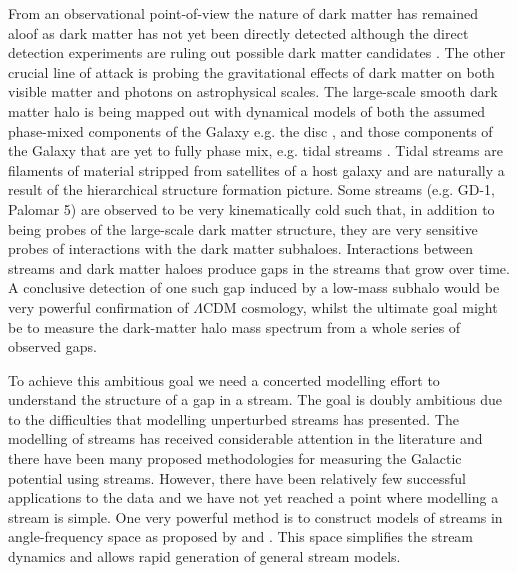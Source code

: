\documentclass[useAMS,usenatbib,fleqn,a4paper]{mn2e}
\begin{document}
From an observational point-of-view the nature of dark matter has remained aloof as dark matter has not yet been directly detected although the direct detection experiments are ruling out possible dark matter candidates \citep{Bertone2005,Feng2010}. The other crucial line of attack is probing the gravitational effects of dark matter on both visible matter and photons on astrophysical scales. The large-scale smooth dark matter halo is being mapped out with dynamical models of both the assumed phase-mixed components of the Galaxy e.g. the disc \citep[e.g.][]{BovyRix2013, Piffl2014}, and those components of the Galaxy that are yet to fully phase mix, e.g. tidal streams \citep[e.g.][]{Koposov2010,Gibbons2014,Kuepper2015,Bowden2015}. Tidal streams are filaments of material stripped from satellites of a host galaxy and are naturally a result of the hierarchical structure formation picture. Some streams (e.g. GD-1, Palomar 5) are observed to be very kinematically cold such that, in addition to being probes of the large-scale dark matter structure, they are very sensitive probes of interactions with the dark matter subhaloes. Interactions between streams and dark matter haloes produce gaps in the streams that grow over time. A conclusive detection of one such gap induced by a low-mass subhalo would be very powerful confirmation of $\Lambda$CDM cosmology, whilst the ultimate goal might be to measure the dark-matter halo mass spectrum from a whole series of observed gaps.

To achieve this ambitious goal we need a concerted modelling effort to understand the structure of a gap in a stream. The goal is doubly ambitious due to the difficulties that modelling unperturbed streams has presented. The modelling of streams has received considerable attention in the literature and there have been many proposed methodologies for measuring the Galactic potential using streams. However, there have been relatively few successful applications to the data \citep[e.g.][]{Koposov2010,LawMajewski2010,Gibbons2014,Kuepper2015,Bowden2015} and we have not yet reached a point where modelling a stream is simple. One very powerful method is to construct models of streams in angle-frequency space as proposed by \cite{Bovy2014} and \cite{Sanders2014}. This space simplifies the stream dynamics \citep{HelmiWhite1999,Tremaine1999} and allows rapid generation of general stream models.
\end{document}
